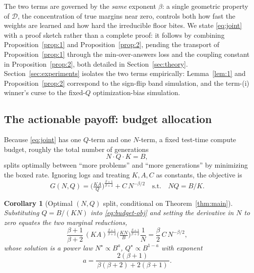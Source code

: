 \documentclass{article} %
\newtheorem{corollary}[theorem]{Corollary}
\providecommand{\D}{\mathcal{D}}
\begin{document}
\noindent The two terms are governed by the \emph{same} exponent $\beta$: a single
geometric property of $\D$, the concentration of true margins near zero, controls
both how fast the weights are learned and how hard the irreducible floor bites.
We state \eqref{eq:joint} with a proof sketch rather than a complete proof: it
follows by combining Proposition~\ref{prop:1} and Proposition~\ref{prop:2},
pending the transport of Proposition~\ref{prop:1} through the min-over-answers
loss and the coupling constant in Proposition~\ref{prop:2}, both detailed in
Section~\ref{sec:theory}. Section~\ref{sec:experiments} isolates the
two terms empirically: Lemma~\ref{lem:1} and Proposition~\ref{prop:2}
correspond to the sign-flip band simulation, and the term-(i) winner's curse to
the fixed-$Q$ optimization-bias simulation.

\subsection{The actionable payoff: budget allocation}
\label{sec:method-budget}

Because \eqref{eq:joint} has one $Q$-term and one $N$-term, a fixed test-time
compute budget, roughly the total number of generations
\begin{equation}
\label{eq:budget-constraint}
N\cdot Q\cdot K = B,
\end{equation}
splits optimally between ``more problems'' and ``more generations'' by minimizing
the boxed rate. Ignoring logs and treating $K,A,C$ as constants, the objective is
\begin{equation}
\label{eq:budget-obj}
G(N,Q) = \Big(\tfrac{KA}{Q}\Big)^{\frac{\beta+1}{\beta+2}} + C\,N^{-\beta/2}
\quad\text{s.t.}\quad NQ = B/K.
\end{equation}

\begin{corollary}[Optimal $(N,Q)$ split, conditional on Theorem~\ref{thm:main}]
\label{prop:1budget}
Substituting $Q = B/(KN)$ into \eqref{eq:budget-obj} and setting the derivative in
$N$ to zero equates the two marginal reductions,
\begin{equation}
\label{eq:budget-stat}
\frac{\beta+1}{\beta+2}\,(KA)^{\frac{\beta+1}{\beta+2}}\Big(\tfrac{KN}{B}\Big)^{\frac{\beta+1}{\beta+2}}\!\frac1N
= \frac{\beta}{2}\,C\,N^{-\beta/2},
\end{equation}
whose solution is a power law $N^\star \propto B^{a}$, $Q^\star \propto B^{1-a}$
with exponent
\begin{equation}
\label{eq:budget-exponent}
a = \frac{2(\beta+1)}{\,\beta(\beta+2) + 2(\beta+1)\,}.
\end{equation}
\end{corollary}
\end{document}
